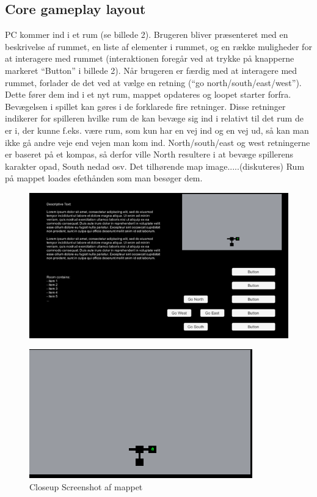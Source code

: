 \subsection{Core gameplay layout}
PC kommer ind i et rum (se billede 2).  Brugeren bliver præsenteret med en beskrivelse af rummet, en liste af elementer i rummet, og en række muligheder for at interagere med rummet (interaktionen foregår ved at trykke på knapperne markeret “Button” i billede 2). Når brugeren er færdig med at interagere med rummet, forlader de det ved at vælge en retning (“go north/south/east/west”). 
Dette fører dem ind i et nyt rum, mappet opdateres og loopet starter forfra.
Bevægelsen i spillet kan gøres i de forklarede fire retninger. Disse retninger indikerer for spilleren hvilke rum de kan bevæge sig ind i relativt til det rum de er i, der kunne f.eks. være rum, som kun har en vej ind og en vej ud, så kan man ikke gå andre veje end vejen man kom ind. North/south/east og west retningerne er baseret på et kompas, så derfor ville North resultere i at bevæge spillerens karakter opad, South nedad osv.
Det tilhørende map image.....(diskuteres)
Rum på mappet loades efethånden som man besøger dem.

\begin{figure}[h]
\centering
\includegraphics[width = \textwidth]{02-Body/Images/SpilLayout-udkast.png}
\caption{}
\label{fig:Spillayout-udkast}
\end{figure}

\begin{figure}[h]
\centering
\includegraphics[width = \textwidth]{02-Body/Images/Map-closeup.png}
\caption{Closeup Screenshot af mappet}
\label{fig:Spillayout-udkast}
\end{figure}

